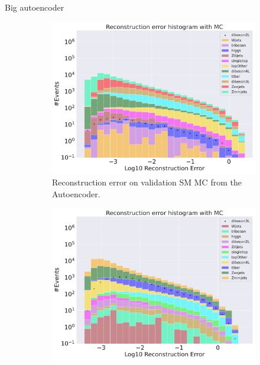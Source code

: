 Big autoencoder

\begin{figure}[h!]
    \centering
    \begin{subfigure}{.8\textwidth}
        \includegraphics[width=\textwidth]{Figures/AE_testing/big/b_data_recon_big_rm3_feats_sig_diboson2L.pdf}
        \caption{Reconstruction error on validation SM MC from the Autoencoder. }
        \label{fig:ae_big_diboson2l}
    \end{subfigure}
    \hfill
    \begin{subfigure}{.8\textwidth}
        \includegraphics[width=\textwidth]{Figures/AE_testing/big/b_data_recon_big_rm3_feats_sig_diboson3L.pdf}
        \caption{}
        \label{fig:ae_big_diboson3l}
    \end{subfigure}
    \hfill        
    \caption{ }
    \label{fig:ae_big_channel1}
\end{figure}

